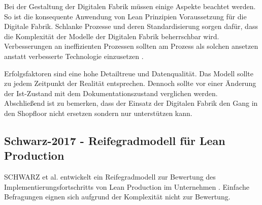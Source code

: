 Bei der Gestaltung der Digitalen Fabrik müssen einige Aspekte beachtet werden. So ist die konsequente Anwendung von Lean Prinzipien Voraussetzung für die Digitale Fabrik. Schlanke Prozesse und deren Standardisierung sorgen dafür, dass die Komplexität der Modelle der Digitalen Fabrik beherrschbar wird. 
Verbesserungen an ineffizienten Prozessen sollten am Prozess als solchen ansetzen anstatt verbesserte Technologie einzusetzen \autocite{Liker2013}. 

Erfolgsfaktoren sind eine hohe Detailtreue und Datenqualität. Das Modell sollte zu jedem Zeitpunkt der Realität entsprechen. Dennoch sollte vor einer Änderung der Ist-Zustand mit dem Dokumentationszustand verglichen werden. 
% 
Abschließend ist zu bemerken, dass der Einsatz der Digitalen Fabrik den Gang in den Shopfloor nicht ersetzen sondern nur unterstützen kann. 


\subsection*{Schwarz-2017 - Reifegradmodell für Lean Production}\label{sec:rgmodell}

SCHWARZ et al. entwickelt ein Reifegradmodell zur Bewertung des Implementierungsfortschritts von Lean Production im Unternehmen \autocite{Schwarz2017}. Einfache Befragungen eignen sich aufgrund der Komplexität nicht zur Bewertung. 

